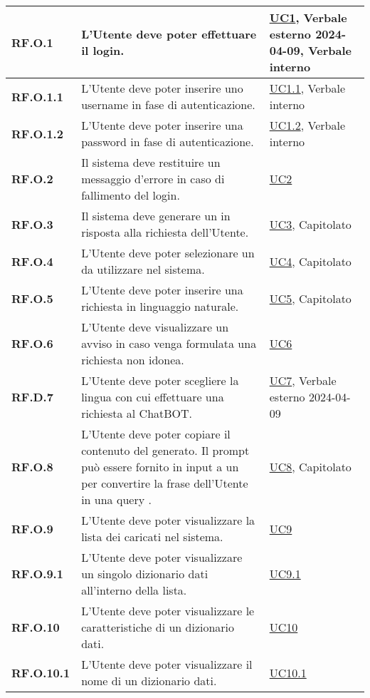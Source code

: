 \begin{adjustwidth}{-0.5cm}{-0.5cm}
\begin{longtable}{|P{3cm}|P{6,5cm}|>{\arraybackslash}P{4cm}|}
    \textbf{RF.O.1} & L'Utente deve poter effettuare il login. & \hyperref[UC1]{UC1}, Verbale esterno 2024-04-09, Verbale interno\\
    \hline
    \textbf{RF.O.1.1} & L'Utente deve poter inserire uno username in fase di autenticazione. & \hyperref[UC1point1]{UC1.1}, Verbale interno\\
    \hline
    \textbf{RF.O.1.2} & L'Utente deve poter inserire una password in fase di autenticazione. & \hyperref[UC1point2]{UC1.2}, Verbale interno\\
    \hline
    \textbf{RF.O.2} & Il sistema deve restituire un messaggio d'errore in caso di fallimento del login. & \hyperref[UC2]{UC2}\\
    \hline
    \textbf{RF.O.3} & Il sistema deve generare un  in risposta alla richiesta dell'Utente. & \hyperref[UC3]{UC3}, Capitolato\\
    \hline
    \textbf{RF.O.4} & L'Utente deve poter selezionare un  da utilizzare nel sistema. & \hyperref[UC4]{UC4}, Capitolato\\
    \hline
    \textbf{RF.O.5} & L'Utente deve poter inserire una richiesta in linguaggio naturale. & \hyperref[UC5]{UC5}, Capitolato\\
    \hline
    \textbf{RF.O.6} & L'Utente deve visualizzare un avviso in caso venga formulata una richiesta non idonea. & \hyperref[UC6]{UC6}\\
    \hline
    \textbf{RF.D.7} & L'Utente deve poter scegliere la lingua con cui effettuare una richiesta al ChatBOT. & \hyperref[UC7]{UC7}, Verbale esterno 2024-04-09\\
    \hline
    \textbf{RF.O.8} & L'Utente deve poter copiare il contenuto del  generato. Il prompt può essere fornito in input a un  per convertire la frase dell'Utente in una query . & \hyperref[UC8]{UC8}, Capitolato\\
    \hline
    \textbf{RF.O.9} & L'Utente deve poter visualizzare la lista dei  caricati nel sistema. & \hyperref[UC9]{UC9}\\
    \hline
    \textbf{RF.O.9.1} & L'Utente deve poter visualizzare un singolo dizionario dati all'interno della lista. & \hyperref[UC9point1]{UC9.1}\\
    \hline
    \textbf{RF.O.10} & L'Utente deve poter visualizzare le caratteristiche di un dizionario dati. & \hyperref[UC10]{UC10}\\
    \hline
    \textbf{RF.O.10.1} & L'Utente deve poter visualizzare il nome di un dizionario dati. & \hyperref[UC10point1]{UC10.1}\\

\end{longtable}
\end{adjustwidth}
